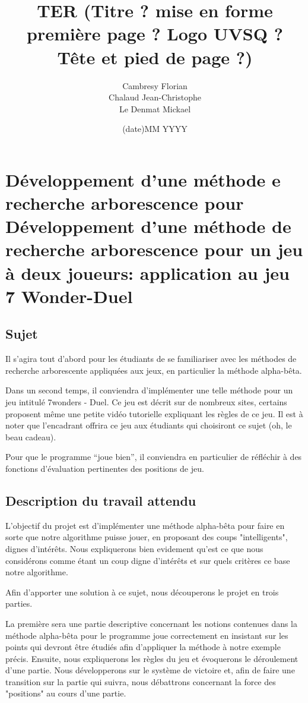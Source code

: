 \documentclass[a4paper, 12pt, french]{article}
\title{TER (Titre ? mise en forme première page ? Logo UVSQ ? Tête et pied de page ?)}
\author{Cambresy Florian \\ Chalaud Jean-Christophe \\ Le Denmat Mickael}
\date{(date)MM YYYY}
\begin{document}
	\maketitle
	\renewcommand{\contentsname}{Table des matières}
	\newpage
	\tableofcontents

	\newpage
	\section{Développement d'une méthode e recherche arborescence pour Développement d'une méthode de recherche
	arborescence pour un jeu à deux joueurs: application au jeu 7 Wonder-Duel}
	\subsection{Sujet}
	Il s’agira tout d’abord pour les étudiants de se familiariser avec les méthodes de recherche arborescente
	appliquées aux jeux, en particulier la méthode alpha-bêta.

	Dans un second temps, il conviendra d'implémenter une telle méthode pour un jeu intitulé 7wonders - Duel.
	Ce jeu est décrit sur de nombreux sites, certains proposent même une petite vidéo tutorielle expliquant
	les règles de ce jeu. Il est à noter que l’encadrant offrira ce jeu aux étudiants qui
	choisiront ce sujet (oh, le beau cadeau).

	Pour que le programme “joue bien”, il conviendra en particulier de réfléchir à des fonctions d'évaluation
	pertinentes des positions de jeu.

	\subsection{Description du travail attendu}
	L'objectif du projet est d'implémenter une méthode alpha-bêta pour faire en sorte que notre algorithme puisse
	jouer, en proposant des coups "intelligents", dignes d'intérêts. Nous expliquerons bien evidement qu'est ce que
	nous considérons comme étant un coup digne d'intérêts et sur quels critères ce base notre algorithme.

	Afin d'apporter une solution à ce sujet, nous découperons le projet en trois parties.

	La première sera une partie descriptive concernant les notions contenues dans la méthode alpha-bêta pour
	le programme joue correctement en insistant sur les points qui devront être étudiés afin d'appliquer la méthode
	à notre exemple précis. Ensuite, nous expliquerons les règles du jeu et évoquerons le déroulement d'une partie.
	Nous développerons sur le système de victoire et, afin de faire une transition sur la partie qui suivra, nous
	débattrons concernant la force des "positions" au cours d'une partie.
\end{document}

